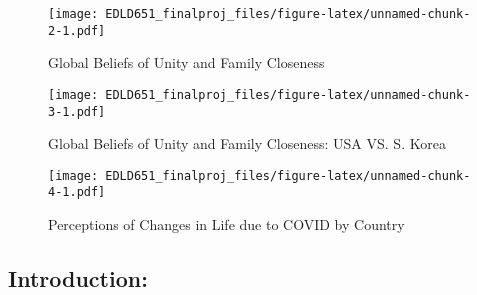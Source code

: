 \documentclass[
  english,
  man]{apa6}
\begin{document}
\begin{figure}
\centering
\texttt{[image: EDLD651\_finalproj\_files/figure-latex/unnamed-chunk-2-1.pdf]}
\caption{\label{fig:unnamed-chunk-2}Global Beliefs of Unity and Family Closeness}
\end{figure}

\begin{figure}
\centering
\texttt{[image: EDLD651\_finalproj\_files/figure-latex/unnamed-chunk-3-1.pdf]}
\caption{\label{fig:unnamed-chunk-3}Global Beliefs of Unity and Family Closeness: USA VS. S. Korea}
\end{figure}

\begin{figure}
\centering
\texttt{[image: EDLD651\_finalproj\_files/figure-latex/unnamed-chunk-4-1.pdf]}
\caption{\label{fig:unnamed-chunk-4}Perceptions of Changes in Life due to COVID by Country}
\end{figure}

\hypertarget{introduction}{%
\subsection{Introduction:}\label{introduction}}
\end{document}

